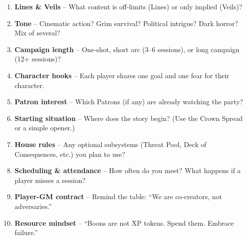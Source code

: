 \begin{tcolorbox}[colback=blue!5!white, colframe=blue!75!black, title=Session Zero Checklist, fonttitle=\bfseries]
\begin{enumerate}
  \item \textbf{Lines \& Veils} – What content is off‑limits (Lines) or only implied (Veils)?
  \item \textbf{Tone} – Cinematic action? Grim survival? Political intrigue? Dark horror? Mix of several?
  \item \textbf{Campaign length} – One‑shot, short arc (3–6 sessions), or long campaign (12+ sessions)?
  \item \textbf{Character hooks} – Each player shares one goal and one fear for their character.
  \item \textbf{Patron interest} – Which Patrons (if any) are already watching the party?
  \item \textbf{Starting situation} – Where does the story begin? (Use the Crown Spread or a simple opener.)
  \item \textbf{House rules} – Any optional subsystems (Threat Pool, Deck of Consequences, etc.) you plan to use?
  \item \textbf{Scheduling \& attendance} – How often do you meet? What happens if a player misses a session?
  \item \textbf{Player-GM contract} – Remind the table: “We are co‑creators, not adversaries.”
  \item \textbf{Resource mindset} – “Boons are not XP tokens. Spend them. Embrace failure.”
\end{enumerate}
\end{tcolorbox}